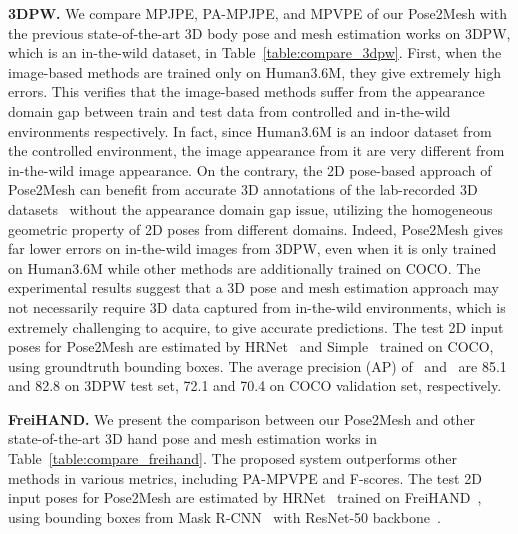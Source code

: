 \documentclass[runningheads]{llncs}
\begin{document}
\noindent\textbf{3DPW.}
We compare MPJPE, PA-MPJPE, and MPVPE of our Pose2Mesh with the previous state-of-the-art 3D body pose and mesh estimation works on 3DPW, which is an in-the-wild dataset, in Table~\ref{table:compare_3dpw}.
First, when the image-based methods are trained only on Human3.6M, they give extremely high errors.
This verifies that the image-based methods suffer from the appearance domain gap between train and test data from controlled and in-the-wild environments respectively.
In fact, since Human3.6M is an indoor dataset from the controlled environment, the image appearance from it are very different from in-the-wild image appearance.
On the contrary, the 2D pose-based approach of Pose2Mesh can benefit from accurate 3D annotations of the lab-recorded 3D datasets~\cite{ionescu2014human3} without the appearance domain gap issue, utilizing the homogeneous geometric property of 2D poses from different domains.
Indeed, Pose2Mesh gives far lower errors on in-the-wild images from 3DPW, even when it is only trained on Human3.6M while other methods are additionally trained on COCO.
The experimental results suggest that a 3D pose and mesh estimation approach may not necessarily require 3D data captured from in-the-wild environments, which is extremely challenging to acquire, to give accurate predictions.
The test 2D input poses for Pose2Mesh are estimated by HRNet~\cite{sun2019deep} and Simple~\cite{xiao2018simple} trained on COCO, using groundtruth bounding boxes.
The average precision (AP) of~\cite{sun2019deep} and~\cite{xiao2018simple} are 85.1 and 82.8 on 3DPW test set, 72.1 and 70.4 on COCO validation set, respectively.


\noindent\textbf{FreiHAND.}
We present the comparison between our Pose2Mesh and other state-of-the-art 3D hand pose and mesh estimation works in Table~\ref{table:compare_freihand}.
The proposed system outperforms other methods in various metrics, including PA-MPVPE and F-scores.
The test 2D input poses for Pose2Mesh are estimated by HRNet~\cite{sun2019deep} trained on FreiHAND~\cite{chris2019Freihand}, using bounding boxes from Mask R-CNN~\cite{he2017mask} with ResNet-50 backbone~\cite{he2016res}.
\end{document}
